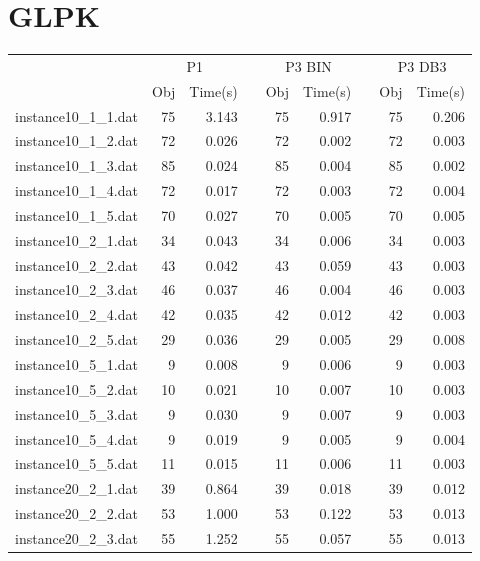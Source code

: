 \newpage
\section{GLPK}

\begin{table}[h!]\centering
{}
\begin{tabular}{@{}rrrcrrcrr@{}}\toprule
& \multicolumn{2}{c}{P1} & \phantom{abc} & \multicolumn{2}{c}{P3 BIN} & \phantom{abc} & \multicolumn{2}{c}{P3 DB3}\\
\cmidrule{2-3} \cmidrule{5-6} \cmidrule{8-9}
& Obj & Time(s) & & Obj & Time(s) & & Obj & Time(s)\\ \midrule
instance10\_1\_1.dat & 75 & 3.143 & & 75 & 0.917 & & 75 & 0.206 \\
instance10\_1\_2.dat & 72 & 0.026 & & 72 & 0.002 & & 72 & 0.003 \\
instance10\_1\_3.dat & 85 & 0.024 & & 85 & 0.004 & & 85 & 0.002 \\
instance10\_1\_4.dat & 72 & 0.017 & & 72 & 0.003 & & 72 & 0.004 \\
instance10\_1\_5.dat & 70 & 0.027 & & 70 & 0.005 & & 70 & 0.005 \\
instance10\_2\_1.dat & 34 & 0.043 & & 34 & 0.006 & & 34 & 0.003 \\
instance10\_2\_2.dat & 43 & 0.042 & & 43 & 0.059 & & 43 & 0.003 \\
instance10\_2\_3.dat & 46 & 0.037 & & 46 & 0.004 & & 46 & 0.003 \\
instance10\_2\_4.dat & 42 & 0.035 & & 42 & 0.012 & & 42 & 0.003 \\
instance10\_2\_5.dat & 29 & 0.036 & & 29 & 0.005 & & 29 & 0.008 \\
instance10\_5\_1.dat & 9 & 0.008 & & 9 & 0.006 & & 9 & 0.003 \\
instance10\_5\_2.dat & 10 & 0.021 & & 10 & 0.007 & & 10 & 0.003 \\
instance10\_5\_3.dat & 9 & 0.030 & & 9 & 0.007 & & 9 & 0.003 \\
instance10\_5\_4.dat & 9 & 0.019 & & 9 & 0.005 & & 9 & 0.004 \\
instance10\_5\_5.dat & 11 & 0.015 & & 11 & 0.006 & & 11 & 0.003 \\
instance20\_2\_1.dat & 39 & 0.864 & & 39 & 0.018 & & 39 & 0.012 \\
instance20\_2\_2.dat & 53 & 1.000 & & 53 & 0.122 & & 53 & 0.013 \\
instance20\_2\_3.dat & 55 & 1.252 & & 55 & 0.057 & & 55 & 0.013 \\

\end{tabular}
\end{table}
